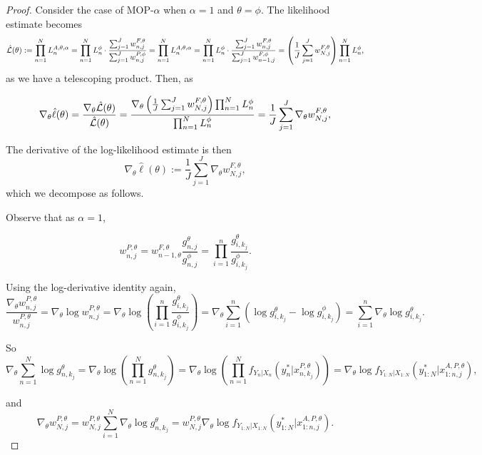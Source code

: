 \documentclass{article}
\begin{document}
\begin{proof}
    
Consider the case of MOP-$\alpha$ when $\alpha=1$ and $\theta=\phi$. The likelihood estimate becomes
\begin{equation*}
    \hat{\mathcal{L}}(\theta) := \prod_{n=1}^N L_n^{A, \theta, \alpha} = \prod_{n=1}^N L_n^\phi \cdot \frac{\sum_{j=1}^J w_{n,j}^{F,\theta}}{\sum_{j=1}^J w_{n,j}^{P,\phi}}= \prod_{n=1}^N L_n^{A, \theta, \alpha} = \prod_{n=1}^N L_n^\phi \cdot \frac{\sum_{j=1}^J w_{n,j}^{F,\theta}}{\sum_{j=1}^J w_{n-1,j}^{F,\phi}} = \left(\frac{1}{J}\sum_{j=1}^J w_{N,j}^{F,\theta}\right) \prod_{n=1}^N L_n^\phi,
\end{equation*}
as we have a telescoping product. Then, as

$$\nabla_\theta \hat\ell(\theta) = \frac{\nabla_\theta \hat{\mathcal{L}}(\theta)}{\hat{\mathcal{L}}(\theta)} = \frac{\nabla_\theta\left(\frac{1}{J}\sum_{j=1}^J w_{N,j}^{F,\theta}\right) \prod_{n=1}^N L_n^\phi}{\prod_{n=1}^N L_n^\phi} =  \frac{1}{J}\sum_{j=1}^J \nabla_\theta w_{N,j}^{F,\theta},$$

The derivative of the log-likelihood estimate is then
\begin{equation*}
    \nabla_\theta \hat{\ell}(\theta) := \frac{1}{J}\sum_{j=1}^J \nabla_\theta w_{N,j}^{F,\theta},
\end{equation*}
which we decompose as follows.

Observe that as $\alpha=1$,

$$w_{n,j}^{P,\theta} = w_{n-1,\theta}^{F,\theta}\frac{g_{n,j}^\theta}{g_{n,j}^\phi} = \prod_{i=1}^n \frac{g_{i,k_j}^\theta}{g_{i,k_j}^\phi}.$$

Using the log-derivative identity again,
$$\frac{\nabla_\theta w_{n,j}^{P,\theta}}{w_{n,j}^{P,\theta}} = \nabla_\theta \log w_{n,j}^{P,\theta} = \nabla_\theta \log \left(\prod_{i=1}^n \frac{g_{i,k_j}^\theta}{g_{i,k_j}^\phi}\right) = \nabla_\theta \sum_{i=1}^n \left(\log g_{i,k_j}^\theta - \log g_{i,k_j}^\phi\right) = \sum_{i=1}^n \nabla_\theta \log g_{i,k_j}^\theta.$$

So 
$$  \nabla_\theta \sum_{n=1}^N \log g_{n,k_j}^\theta = \nabla_\theta \log\left(\prod_{n=1}^N g_{n,k_j}^\theta\right) =  \nabla_\theta \log\left(\prod_{n=1}^N f_{Y_n|X_n}\left(y_n^* | x_{n,k_j}^{P,\theta}\right)\right) = \nabla_\theta \log f_{Y_{1:N}|X_{1:N}}\left(y_{1:N}^* | x_{1:n,j}^{A, P,\theta}\right),$$

and 
$$\nabla_\theta w_{N,j}^{P,\theta} = w_{N,j}^{P,\theta} \sum_{i=1}^N \nabla_\theta \log g_{n,k_j}^\theta = w_{N,j}^{P,\theta} \nabla_\theta \log f_{Y_{1:N}|X_{1:N}}\left(y_{1:N}^* | x_{1:n,j}^{A, P,\theta}\right).$$


\end{proof}
\end{document}
